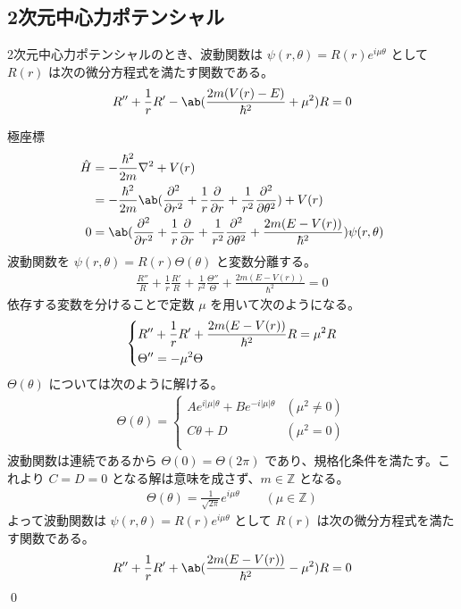 \documentclass[uplatex,dvipdfmx,a4paper,11pt]{jlreq}
\makeatletter
\newcommand{\ZZ}{\mathbb{Z}}
\numberwithin{equation}{section}
\theoremstyle{definition}
\renewenvironment{proof}[1][\proofname]{\par
  \normalfont
  \topsep6\p@\@plus6\p@ \trivlist
  \item[\hskip\labelsep{\bfseries #1}\@addpunct{\bfseries}]\ignorespaces\quad\par
}{%
  \qed\endtrivlist\@endpefalse
}
\renewcommand\proofname{証明}
\makeatother
\begin{document}
\subsection{2次元中心力ポテンシャル}
\begin{proposition}
  2次元中心力ポテンシャルのとき、波動関数は $\psi(r, \theta) = R(r)e^{i\mu\theta}$ として $R(r)$ は次の微分方程式を満たす関数である。
  \begin{align}
    R'' + \frac{1}{r}R' - \ab(\frac{2m(V(r) - E)}{\hbar^2} + \mu^2)R = 0
  \end{align}
\end{proposition}
\begin{proof}
  極座標
  \begin{align}
    \hat{H} & = -\frac{\hbar^2}{2m}\laplacian + V(r)                                                                              \\
            & = -\frac{\hbar^2}{2m}\ab(\pdv[2]{r} + \frac{1}{r}\pdv{r} + \frac{1}{r^2}\pdv[2]{\theta}) + V(r)                     \\
    0       & = \ab(\pdv[2]{r} + \frac{1}{r}\pdv{r} + \frac{1}{r^2}\pdv[2]{\theta} + \frac{2m(E - V(r))}{\hbar^2})\psi(r, \theta)
  \end{align}
  波動関数を $\psi(r, \theta) = R(r)\Theta(\theta)$ と変数分離する。
  \begin{align}
    \frac{R''}{R} + \frac{1}{r}\frac{R'}{R} + \frac{1}{r^2}\frac{\Theta''}{\Theta} + \frac{2m(E - V(r))}{\hbar^2} = 0
  \end{align}
  依存する変数を分けることで定数 $\mu$ を用いて次のようになる。
  \begin{align}
    \begin{dcases}
      R'' + \frac{1}{r}R' + \frac{2m(E - V(r))}{\hbar^2}R = \mu^2R \\
      \Theta'' = -\mu^2\Theta
    \end{dcases}
  \end{align}
  $\Theta(\theta)$ については次のように解ける。
  \begin{align}
    \Theta(\theta) = \begin{cases}
                       Ae^{i|\mu|\theta} + Be^{-i|\mu|\theta} & (\mu^2 \neq 0) \\
                       C\theta + D                            & (\mu^2 = 0)    \\
                     \end{cases}
  \end{align}
  波動関数は連続であるから $\Theta(0) = \Theta(2\pi)$ であり、規格化条件を満たす。これより $C = D = 0$ となる解は意味を成さず、$m\in\ZZ$ となる。
  \begin{align}
    \Theta(\theta) = \frac{1}{\sqrt{2\pi}}e^{i\mu\theta} \qquad (\mu\in\ZZ)
  \end{align}
  よって波動関数は $\psi(r, \theta) = R(r)e^{i\mu\theta}$ として $R(r)$ は次の微分方程式を満たす関数である。
  \begin{align}
    R'' + \frac{1}{r}R' + \ab(\frac{2m(E - V(r))}{\hbar^2} - \mu^2)R = 0
  \end{align}
\end{proof}
\end{document}
